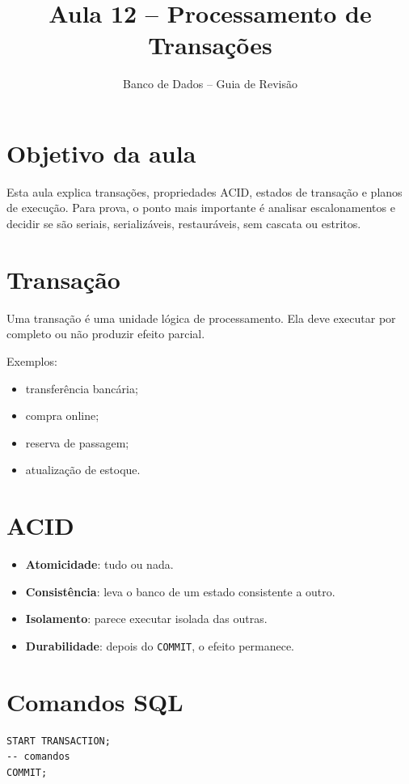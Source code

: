 \documentclass[12pt,a4paper]{article}
\title{Aula 12 -- Processamento de Transações}
\author{Banco de Dados -- Guia de Revisão}
\date{}
\begin{document}
\maketitle
\tableofcontents
\newpage

\section{Objetivo da aula}
Esta aula explica transações, propriedades ACID, estados de transação e planos de execução. Para prova, o ponto mais importante é analisar escalonamentos e decidir se são seriais, serializáveis, restauráveis, sem cascata ou estritos.

\section{Transação}
Uma transação é uma unidade lógica de processamento. Ela deve executar por completo ou não produzir efeito parcial.

Exemplos:
\begin{itemize}
    \item transferência bancária;
    \item compra online;
    \item reserva de passagem;
    \item atualização de estoque.
\end{itemize}

\section{ACID}
\begin{itemize}
    \item \textbf{Atomicidade}: tudo ou nada.
    \item \textbf{Consistência}: leva o banco de um estado consistente a outro.
    \item \textbf{Isolamento}: parece executar isolada das outras.
    \item \textbf{Durabilidade}: depois do \texttt{COMMIT}, o efeito permanece.
\end{itemize}

\section{Comandos SQL}
\begin{verbatim}
START TRANSACTION;
-- comandos
COMMIT;
\end{verbatim}
\end{document}
